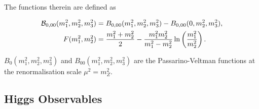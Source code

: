 \documentclass[preprint,3p,12pt]{elsarticle}
\begin{document}
The functions therein are defined as

\begin{align}
 {\cal B}_{0,00}(m_1^2,m_2^2,m_3^2) &= B_{0,00}(m_1^2,m_2^2,m_3^2)-B_{0,00}(0,m_2^2,m_3^2), \nonumber \\
 F(m_1^2,m_2^2) &= \frac{m_1^2+m_2^2}{2} - \frac{m_1^2 m_2^2}{m_1^2-m_2^2} \ln \left( \frac{m_1^2}{m_2^2} \right) . \nonumber
\end{align}

$B_0(m_1^2,m_2^2,m_3^2)$ and $B_{00}(m_1^2,m_2^2,m_3^2)$ are the Passarino-Veltman functions at the renormalisation scale $\mu^2=m_Z^2$.

\subsection{Higgs Observables}
\label{sec:HSS}
\end{document}
